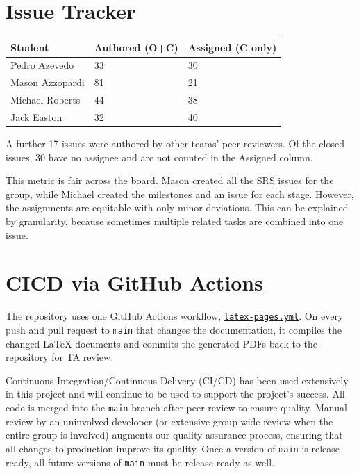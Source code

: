\documentclass{article}
\begin{document}
\section{Issue Tracker}

\begin{table}[H]
\centering
\begin{tabular}{lll}
\toprule
\textbf{Student} & \textbf{Authored (O+C)} & \textbf{Assigned (C only)}\\
\midrule
Pedro Azevedo & 33 & 30 \\
Mason Azzopardi & 81 & 21 \\
Michael Roberts & 44 & 38 \\
Jack Easton & 32 & 40 \\
\bottomrule
\end{tabular}
\end{table}

A further 17 issues were authored by other teams' peer reviewers. Of the closed
issues, 30 have no assignee and are not counted in the Assigned column.

This metric is fair across the board. Mason created all the SRS issues for the group,
while Michael created the milestones and an issue for each stage. However, the assignments
are equitable with only minor deviations. This can be explained by granularity, because sometimes
multiple related tasks are combined into one issue.

\section{CICD via GitHub Actions}

The repository uses one GitHub Actions workflow,
\href{https://github.com/JackEaston4/Troitsky-Toolbox/blob/main/.github/workflows/latex-pages.yml}{\texttt{latex-pages.yml}}.
On every push and pull request to \texttt{main} that changes the documentation,
it compiles the changed LaTeX documents and commits the generated PDFs back to
the repository for TA review.

Continuous Integration/Continuous Delivery (CI/CD) has been used extensively in this project and will continue to be
used to support the project's success. All code is merged into the \texttt{main} branch
after peer review to ensure quality. Manual review by an uninvolved developer (or extensive group-wide review when the entire group is involved)
augments our quality assurance process, ensuring that all changes to production improve its quality. Once a 
version of \texttt{main} is release-ready, all future versions of \texttt{main} must be release-ready as well.
\end{document}
